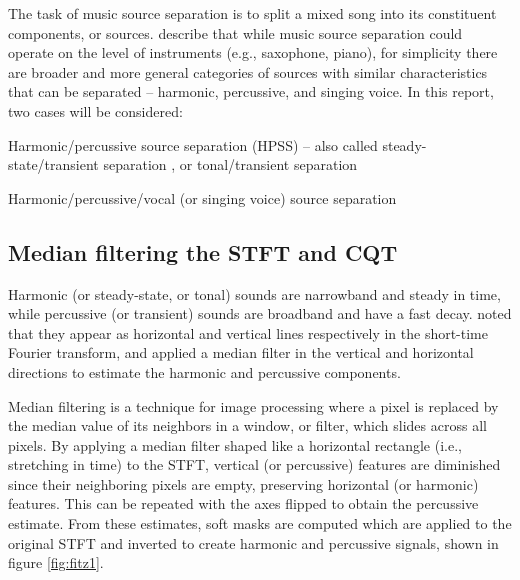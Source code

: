 \documentclass[letter,12pt]{article}
\newenvironment{tight_enumerate}{
\begin{enumerate}
  \setlength{\itemsep}{0pt}
  \setlength{\parskip}{0pt}
}{\end{enumerate}}
\begin{document}
The task of music source separation is to split a mixed song into its constituent components, or sources. \citet{musicsepgood} describe that while music source separation could operate on the level of instruments (e.g., saxophone, piano), for simplicity there are broader and more general categories of sources with similar characteristics that can be separated -- harmonic, percussive, and singing voice. In this report, two cases will be considered:

\begin{tight_enumerate}
	\item
		Harmonic/percussive source separation (HPSS) -- also called steady-state/transient separation \cite{bayarres}, or tonal/transient separation \cite{tfjigsaw, wmdct}
	\item
		Harmonic/percussive/vocal (or singing voice) source separation
\end{tight_enumerate}

\subsection{Median filtering the STFT and CQT}

Harmonic (or steady-state, or tonal) sounds are narrowband and steady in time, while percussive (or transient) sounds are broadband and have a fast decay. \citet{fitzgerald1} noted that they appear as horizontal and vertical lines respectively in the short-time Fourier transform, and applied a median filter in the vertical and horizontal directions to estimate the harmonic and percussive components.

Median filtering is a technique for image processing where a pixel is replaced by the median value of its neighbors in a window, or filter, which slides across all pixels. By applying a median filter shaped like a horizontal rectangle (i.e., stretching in time) to the STFT, vertical (or percussive) features are diminished since their neighboring pixels are empty, preserving horizontal (or harmonic) features. This can be repeated with the axes flipped to obtain the percussive estimate. From these estimates, soft masks are computed which are applied to the original STFT and inverted to create harmonic and percussive signals, shown in figure \ref{fig:fitz1}.
\end{document}
